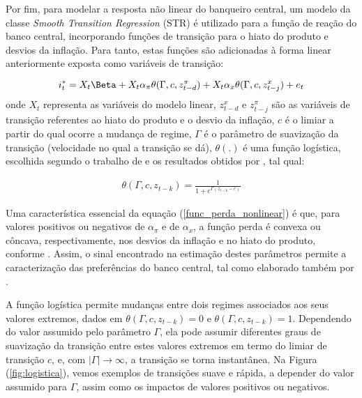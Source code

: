 \documentclass[
	article,			%
	11pt,				%
	oneside,			%
	a4paper,			%
	english,			%
	brazil,				%
	]{abntex2}
\begin{document}
	Por fim, para modelar a resposta não linear do banqueiro central, um modelo da classe \textit{Smooth Transition Regression} (STR) é utilizado para a função de reação do banco central, incorporando funções de transição para o hiato do produto e desvios da inflação. Para tanto, estas funções são adicionadas à forma linear anteriormente exposta como variáveis de transição:
	
	\begin{equation} \label{func_perda_nonlinear}
		i_t^* = X_t \Beta + X_t \alpha_\pi \theta(\Gamma,c,z_{t-d}^\pi) + X_t \alpha_x \theta (\Gamma,c,z_{t-j}^x) + e_t
	\end{equation}
	onde $X_t$ representa as variáveis do modelo linear, $z_{t-d}^x$ e $z_{t-j}^\pi$ são as variáveis de transição referentes ao hiato do produto e o desvio da inflação, $c$ é o limiar a partir do qual ocorre a mudança de regime, $\Gamma$ é o parâmetro de suavização da transição (velocidade no qual a transição se dá), $\theta(.)$ é uma função logística, escolhida segundo o trabalho de  e os resultados obtidos por , tal qual:
	
	\begin{eqnarray}  \label{func_log}
		\theta (\Gamma,c,z_{t-k}) = \frac{1}{1+e^{\Gamma (z_{t-k} - c)}} 
	\end{eqnarray}
	
	Uma característica essencial da equação (\ref{func_perda_nonlinear}) é que, para valores positivos ou negativos de $\alpha_\pi$ e de $\alpha_x$, a função perda é convexa ou côncava, respectivamente, nos desvios da inflação e no hiato do produto, conforme . Assim, o sinal encontrado na estimação destes parâmetros permite a caracterização das preferências do banco central, tal como elaborado também por .
	
	A função logística permite mudanças entre dois regimes associados aos seus valores extremos, dados em $\theta (\Gamma,c,z_{t-k}) = 0$ e $\theta (\Gamma,c,z_{t-k}) = 1$. Dependendo do valor assumido pelo parâmetro $\Gamma$, ela pode assumir diferentes graus de suavização da transição entre estes valores extremos em termo do limiar de transição $c$, e, com $| \Gamma | \rightarrow \infty$, a transição se torna instantânea. Na Figura (\ref{fig:logistica}), vemos exemplos de transições suave e rápida, a depender do valor assumido para $\Gamma$, assim como os impactos de valores positivos ou negativos. 
	
\end{document}
